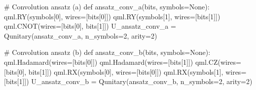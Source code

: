 \documentclass[
  13pt,
  a4paper,
  DIV=11,
  numbers=noendperiod]{scrreprt}
\newenvironment{Shaded}{\begin{snugshade}}{\end{snugshade}}
\newcommand{\CommentTok}[1]{\textcolor[rgb]{0.37,0.37,0.37}{#1}}
\newcommand{\DecValTok}[1]{\textcolor[rgb]{0.68,0.00,0.00}{#1}}
\newcommand{\KeywordTok}[1]{\textcolor[rgb]{0.00,0.23,0.31}{#1}}
\newcommand{\NormalTok}[1]{\textcolor[rgb]{0.00,0.23,0.31}{#1}}
\newcommand{\OperatorTok}[1]{\textcolor[rgb]{0.37,0.37,0.37}{#1}}
\newcommand{\VariableTok}[1]{\textcolor[rgb]{0.07,0.07,0.07}{#1}}
\begin{document}
\begin{Shaded}
\begin{Highlighting}[]
\CommentTok{\# Convolution ansatz (a) }
\KeywordTok{def}\NormalTok{ ansatz\_conv\_a(bits, symbols}\OperatorTok{=}\VariableTok{None}\NormalTok{):}
\NormalTok{  qml.RY(symbols[}\DecValTok{0}\NormalTok{], wires}\OperatorTok{=}\NormalTok{[bits[}\DecValTok{0}\NormalTok{]])}
\NormalTok{  qml.RY(symbols[}\DecValTok{1}\NormalTok{], wires}\OperatorTok{=}\NormalTok{[bits[}\DecValTok{1}\NormalTok{]])}
\NormalTok{  qml.CNOT(wires}\OperatorTok{=}\NormalTok{[bits[}\DecValTok{0}\NormalTok{], bits[}\DecValTok{1}\NormalTok{]])}
\NormalTok{U\_ansatz\_conv\_a }\OperatorTok{=}\NormalTok{ Qunitary(ansatz\_conv\_a, n\_symbols}\OperatorTok{=}\DecValTok{2}\NormalTok{, arity}\OperatorTok{=}\DecValTok{2}\NormalTok{)}

\CommentTok{\# Convolution ansatz (b) }
\KeywordTok{def}\NormalTok{ ansatz\_conv\_b(bits, symbols}\OperatorTok{=}\VariableTok{None}\NormalTok{):}
\NormalTok{  qml.Hadamard(wires}\OperatorTok{=}\NormalTok{[bits[}\DecValTok{0}\NormalTok{]])}
\NormalTok{  qml.Hadamard(wires}\OperatorTok{=}\NormalTok{[bits[}\DecValTok{1}\NormalTok{]])}
\NormalTok{  qml.CZ(wires}\OperatorTok{=}\NormalTok{[bits[}\DecValTok{0}\NormalTok{], bits[}\DecValTok{1}\NormalTok{]])}
\NormalTok{  qml.RX(symbols[}\DecValTok{0}\NormalTok{], wires}\OperatorTok{=}\NormalTok{[bits[}\DecValTok{0}\NormalTok{]])}
\NormalTok{  qml.RX(symbols[}\DecValTok{1}\NormalTok{], wires}\OperatorTok{=}\NormalTok{[bits[}\DecValTok{1}\NormalTok{]])}
\NormalTok{U\_ansatz\_conv\_b }\OperatorTok{=}\NormalTok{ Qunitary(ansatz\_conv\_b, n\_symbols}\OperatorTok{=}\DecValTok{2}\NormalTok{, arity}\OperatorTok{=}\DecValTok{2}\NormalTok{)}


\end{Highlighting}
\end{Shaded}
\end{document}
